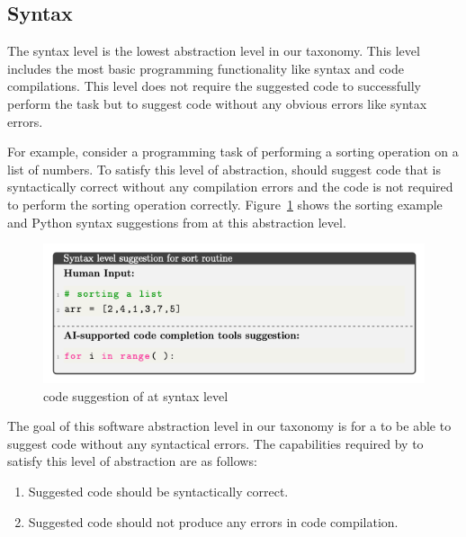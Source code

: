 \subsection{Syntax}
\label{syntax}
The syntax level is the lowest abstraction level in our taxonomy. This level includes the most basic programming functionality like syntax and code compilations. This level does not require the \cct{} suggested code to successfully perform the task but to suggest code without any obvious errors like syntax errors.

For example, consider a programming task of performing a sorting operation on a list of numbers. 
To satisfy this level of abstraction, \cct{} should suggest code that is syntactically correct without any compilation errors and the code is not required to perform the sorting operation correctly. 
Figure~\ref{fig:syntax} shows the sorting example and Python syntax suggestions from \cct{} at this abstraction level.

\begin{figure}[hbt!]
    \centering
    \includegraphics[width=\linewidth]{Figures/syntax.png}
    \caption{code suggestion of \cct{} at syntax level}
    \label{fig:syntax}
\end{figure}

The goal of this software abstraction level in our taxonomy is for a \cct{} to be able to suggest code without any syntactical errors.
The capabilities required by \cct{} to satisfy this level of abstraction are as follows:

\begin{enumerate}
    \item Suggested code should be syntactically correct.
    \item Suggested code should not produce any errors in code compilation.
\end{enumerate}

